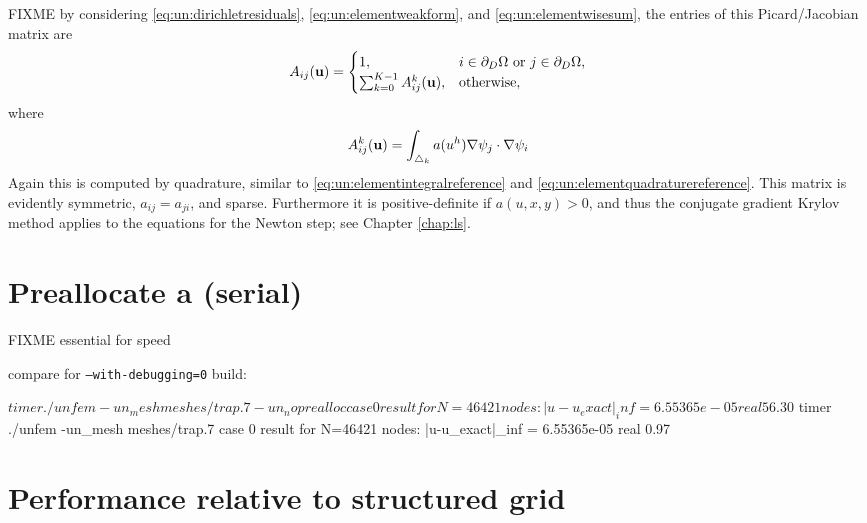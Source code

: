 FIXME by considering \eqref{eq:un:dirichletresiduals}, \eqref{eq:un:elementweakform}, and \eqref{eq:un:elementwisesum}, the entries of this Picard/Jacobian matrix are
\begin{equation}
A_{ij}(\mathbf{u}) =  \begin{cases}
               1, & i \in \partial_D\Omega \text{ or } j \in \partial_D\Omega, \\
               \sum_{k=0}^{K-1} A_{ij}^k(\mathbf{u}), & \text{otherwise},
               \end{cases} \label{eq:un:picardentry}
\end{equation}
where
\begin{equation}
A_{ij}^k(\mathbf{u}) = \int_{\triangle_k} a(u^h) \nabla\psi_j \cdot \nabla\psi_i \label{eq:un:picardentryelement}
\end{equation}
Again this is computed by quadrature, similar to \eqref{eq:un:elementintegralreference} and \eqref{eq:un:elementquadraturereference}.  This matrix is evidently symmetric, $a_{ij}=a_{ji}$, and sparse.  Furthermore it is positive-definite if $a(u,x,y)>0$, and thus the conjugate gradient Krylov method applies to the equations for the Newton step; see Chapter \ref{chap:ls}.




\section{Preallocate a \pMat (serial)}

FIXME essential for speed


compare for \texttt{--with-debugging=0} build:
\begin{cline}
$ timer ./unfem -un_mesh meshes/trap.7 -un_noprealloc
case 0 result for N=46421 nodes:  |u-u_exact|_inf = 6.55365e-05
real 56.30
$ timer ./unfem -un_mesh meshes/trap.7
case 0 result for N=46421 nodes:  |u-u_exact|_inf = 6.55365e-05
real 0.97
\end{cline}

\section{Performance relative to \pDMDA structured grid}

